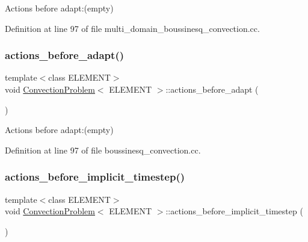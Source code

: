 Actions before adapt\+:(empty) 



Definition at line 97 of file multi\+\_\+domain\+\_\+boussinesq\+\_\+convection.\+cc.

\mbox{\label{classConvectionProblem_ac546cecdb98a75923d0a5af4b0a223a1}} 
\subsubsection{\texorpdfstring{actions\+\_\+before\+\_\+adapt()}{actions\_before\_adapt()}\hspace{0.1cm}{\footnotesize\ttfamily [2/2]}}
{\footnotesize\ttfamily template$<$class E\+L\+E\+M\+E\+NT$>$ \\
void \hyperlink{classConvectionProblem}{Convection\+Problem}$<$ E\+L\+E\+M\+E\+NT $>$\+::actions\+\_\+before\+\_\+adapt (\begin{DoxyParamCaption}{ }\end{DoxyParamCaption})\hspace{0.3cm}{\ttfamily [inline]}}



Actions before adapt\+:(empty) 



Definition at line 97 of file boussinesq\+\_\+convection.\+cc.

\mbox{\label{classConvectionProblem_a37c80882d173c02bfb3dfca924a4ec61}} 
\subsubsection{\texorpdfstring{actions\+\_\+before\+\_\+implicit\+\_\+timestep()}{actions\_before\_implicit\_timestep()}\hspace{0.1cm}{\footnotesize\ttfamily [1/2]}}
{\footnotesize\ttfamily template$<$class E\+L\+E\+M\+E\+NT$>$ \\
void \hyperlink{classConvectionProblem}{Convection\+Problem}$<$ E\+L\+E\+M\+E\+NT $>$\+::actions\+\_\+before\+\_\+implicit\+\_\+timestep (\begin{DoxyParamCaption}{ }\end{DoxyParamCaption})\hspace{0.3cm}{\ttfamily [inline]}}



